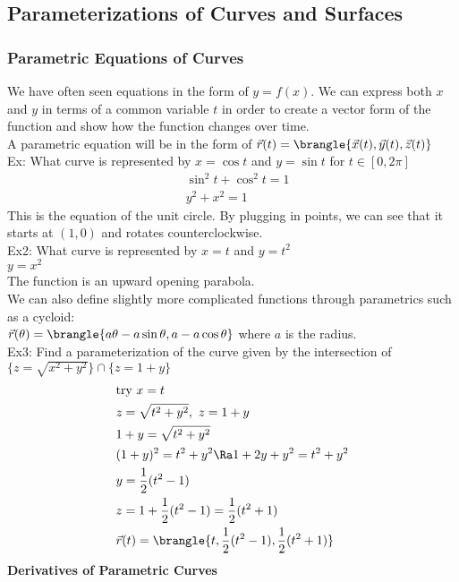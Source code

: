 \subsection{Parameterizations of Curves and Surfaces}

\subsubsection{Parametric Equations of Curves}
We have often seen equations in the form of $y=f(x)$. We can express both $x$ and $y$ in terms of a common variable $t$ in order to create a vector form of the function and show how the function changes over time.\\
A parametric equation will be in the form of $\vec{r}(t)=\brangle{\vec{x}(t),\vec{y}(t),\vec{z}(t)}$\\
Ex: What curve is represented by $x=\cos t$ and $y=\sin t$ for $t\in[0,2\pi]$
\begin{align*}
    &\sin^2t+\cos^2t=1\\
    &y^2+x^2=1
\end{align*}
This is the equation of the unit circle. By plugging in points, we can see that it starts at $(1,0)$ and rotates counterclockwise.\\
Ex2: What curve is represented by $x=t$ and $y=t^2$\\
$y=x^2$\\
The function is an upward opening parabola.\\
We can also define slightly more complicated functions through parametrics such as a cycloid:\\
$\vec{r}(\theta)=\brangle{a\theta-a\sin\theta,a-a\cos\theta}$ where $a$ is the radius.\\
Ex3: Find a parameterization of the curve given by the intersection of $\{z=\sqrt{x^2+y^2}\}\cap\{z=1+y\}$\\
\begin{align*}
    &\text{try }x=t\\
    &z=\sqrt{t^2+y^2},\ z=1+y\\
    &1+y=\sqrt{t^2+y^2}\\
    &(1+y)^2=t^2+y^2\Ra 1+2y+y^2=t^2+y^2\\
    &y=\frac{1}{2}(t^2-1)\\
    &z=1+\frac{1}{2}(t^2-1)=\frac{1}{2}(t^2+1)\\
    &\vec{r}(t)=\brangle{t,\frac{1}{2}(t^2-1),\frac{1}{2}(t^2+1)}
\end{align*}
\textbf{Derivatives of Parametric Curves}\\
